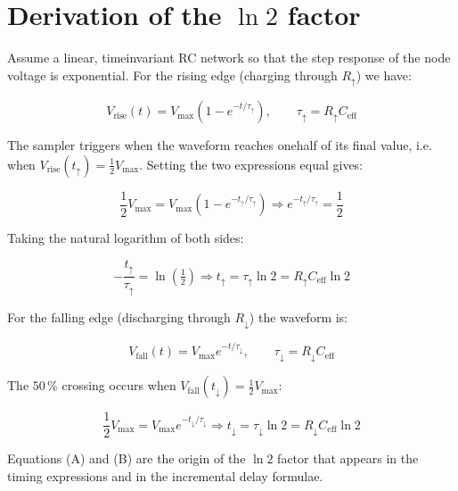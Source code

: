 \section{Derivation of the \texorpdfstring{$\ln 2$}{ln 2} factor}
\label{app:ln2_derivation}

Assume a linear, time\textendash invariant RC network so that the step response of the
node voltage is exponential. For the rising edge (charging through
$R_{\uparrow}$) we have:

\[
V_{\text{rise}}(t) = V_{\max}\!\left(1-e^{-t/\tau_{\uparrow}}\right),
\qquad
\tau_{\uparrow}=R_{\uparrow}C_{\mathrm{eff}}
\]

The sampler triggers when the waveform reaches one\textendash half of its final value,
i.e. when $V_{\text{rise}}(t_{\uparrow})=\tfrac{1}{2}V_{\max}$. Setting
the two expressions equal gives:

\[
\frac{1}{2}V_{\max}
      = V_{\max}\left(1-e^{-t_{\uparrow}/\tau_{\uparrow}}\right)
\Longrightarrow
e^{-t_{\uparrow}/\tau_{\uparrow}} = \frac{1}{2}
\]

Taking the natural logarithm of both sides:

\[
-\frac{t_{\uparrow}}{\tau_{\uparrow}}
      = \ln\!\left(\tfrac{1}{2}\right)
\Longrightarrow
t_{\uparrow}= \tau_{\uparrow}\ln 2
            = R_{\uparrow}C_{\mathrm{eff}}\ln 2
\tag{A}
\]

For the falling edge (discharging through $R_{\downarrow}$) the waveform is:

\[
V_{\text{fall}}(t) = V_{\max}e^{-t/\tau_{\downarrow}},
\qquad
\tau_{\downarrow}=R_{\downarrow}C_{\mathrm{eff}}
\]

The $50\,\%$ crossing occurs when $V_{\text{fall}}(t_{\downarrow})=
\tfrac{1}{2}V_{\max}$:

\[
\frac{1}{2}V_{\max}
      = V_{\max}e^{-t_{\downarrow}/\tau_{\downarrow}}
\Longrightarrow
t_{\downarrow}= \tau_{\downarrow}\ln 2
              = R_{\downarrow}C_{\mathrm{eff}}\ln 2
\tag{B}
\]

Equations (A) and (B) are the origin of the $\ln 2$ factor that
appears in the timing expressions and in the incremental delay formulae.

